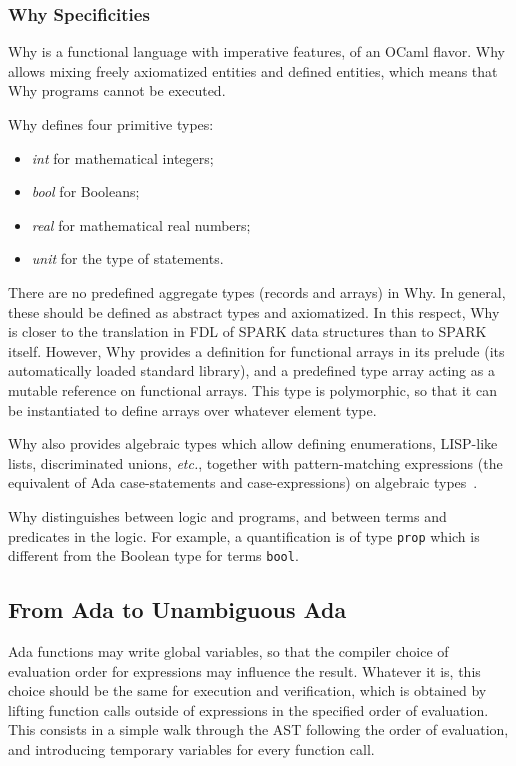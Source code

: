 \documentclass{article}
\newcounter{example}
\newcommand{\etc}{\textit{etc.}\xspace}
\begin{document}
\subsubsection{Why Specificities}

Why is a functional language with imperative features, of an OCaml flavor. Why
allows mixing freely axiomatized entities and defined entities, which means
that Why programs cannot be executed.

Why defines four primitive types:
\begin{itemize}
\item \emph{int} for mathematical integers;
\item \emph{bool} for Booleans;
\item \emph{real} for mathematical real numbers;
\item \emph{unit} for the type of statements.
\end{itemize}

There are no predefined aggregate types (records and arrays) in Why. In
general, these should be defined as abstract types and axiomatized. In this
respect, Why is closer to the translation in FDL of SPARK data structures than
to SPARK itself. However, Why provides a definition for functional arrays in
its prelude (its automatically loaded standard library), and a predefined type
array acting as a mutable reference on functional arrays. This type is
polymorphic, so that it can be instantiated to define arrays over whatever
element type.

Why also provides algebraic types which allow defining enumerations, LISP-like
lists, discriminated unions, \etc, together with pattern-matching expressions
(the equivalent of Ada case-statements and case-expressions) on algebraic
types~\cite{Paskevich09RR}.

Why distinguishes between logic and programs, and between terms and predicates
in the logic. For example, a quantification is of type \verb|prop| which is
different from the Boolean type for terms \verb|bool|.

\subsection{From Ada to Unambiguous Ada}
\label{sub:slicing-function}

Ada functions may write global variables, so that the compiler choice of
evaluation order for expressions may influence the result. Whatever it is, this
choice should be the same for execution and verification, which is obtained by
lifting function calls outside of expressions in the specified order of
evaluation. This consists in a simple walk through the AST following the order
of evaluation, and introducing temporary variables for every function
call. 
\end{document}
